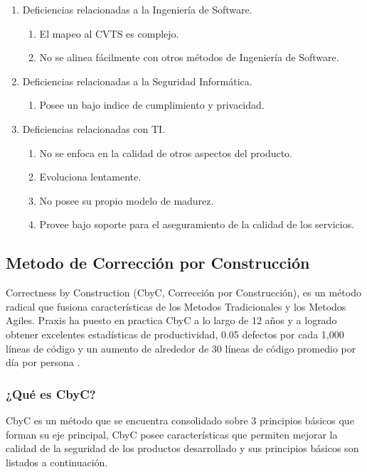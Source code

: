 \documentclass[runningheads,a4paper]{llncs}
\begin{document}
\begin{enumerate}
	\item Deficiencias relacionadas a la Ingeniería de \gls{Software}.
		\begin{enumerate}
			\item El mapeo al \gls{CVTS} es complejo.
			\item No se alinea fácilmente con otros métodos de Ingeniería de Software.\\
			
		\end{enumerate}
	\item Deficiencias relacionadas a la Seguridad Informática.
		\begin{enumerate}
			\item Posee un bajo indice de cumplimiento y privacidad.\\
			
		\end{enumerate}
	\item Deficiencias relacionadas con \gls{TI}.
		\begin{enumerate}
			\item No se enfoca en la calidad de otros aspectos del producto.
			\item Evoluciona lentamente.
			\item No posee su propio modelo de madurez.
			\item Provee bajo soporte para el aseguramiento de la calidad de los servicios.\\
			
		\end{enumerate}
\end{enumerate}
\subsection{Metodo de Corrección por Construcción}
Correctness by Construction (CbyC, Corrección por Construcción), es un método radical que fusiona características de los \gls{Metodos Tradicionales} y los \gls{Metodos Agiles}. \gls{Praxis} ha puesto en practica \gls{CbyC} a lo largo de 12 años y a logrado obtener excelentes estadísticas de productividad, 0.05 defectos por cada 1,000 líneas de código y un aumento de alrededor de 30 líneas de código promedio por día por persona \cite{CbyCIntroduction}.   

\subsubsection{¿Qué es \gls{CbyC}?}
\gls{CbyC} es un método que se encuentra consolidado sobre 3 principios básicos que forman su eje principal, \gls{CbyC} posee características que permiten mejorar la calidad de la seguridad de los productos desarrollado y sus principios básicos son listados a continuación.
\end{document}
